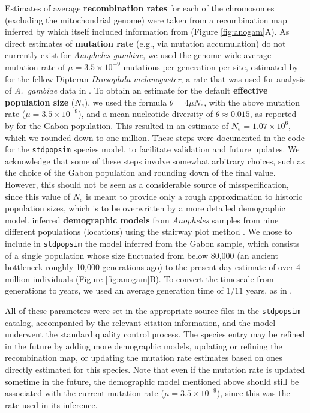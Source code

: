 \documentclass[hidelinks]{article}
\newcommand{\stdpopsim}{\texttt{stdpopsim}\xspace}
\begin{document}

Estimates of average \textbf{recombination rates} for each of the chromosomes (excluding the mitochondrial genome)
were taken from a recombination map inferred by \citet{Pombi2006} which itself included information from
\citet{zheng1996integrated} (Figure \ref{fig:anogam}A).
As direct estimates of \textbf{mutation rate} (e.g., via mutation accumulation) do not currently exist for \emph{Anopheles gambiae},
we used the genome-wide average mutation rate of $\mu=3.5 \times 10^{-9}$ mutations per generation per site,
estimated by \cite{Keightley2009} for the fellow Dipteran \textit{Drosophila melanogaster},
a rate that was used for analysis of \textit{A.~gambiae} data in \citet{Miles2017}.
To obtain an estimate for the default \textbf{effective population size} ($N_e$),
we used the formula $\theta=4\mu N_e$,
with the above mutation rate ($\mu=3.5 \times 10^{-9}$),
and a mean nucleotide diversity of $\theta\approx 0.015$,
as reported by \citet{Miles2017} for the Gabon population.
This resulted in an estimate of $N_e=1.07\times 10^{6}$,
which we rounded down to one million. 
These steps were documented in the code for the \stdpopsim species model,
to facilitate validation and future updates.
We acknowledge that some of these steps involve somewhat arbitrary choices,
such as the choice of the Gabon population and rounding down of the final value.
However, this should not be seen as a considerable source of misspecification,
since this value of $N_e$ is meant to provide only a rough approximation to
historic population sizes, which is to be overwritten by a more detailed demographic model.
\citet{Miles2017} inferred \textbf{demographic models} from \textit{Anopheles} samples from nine different populations (locations) using the stairway plot method \citep{Liu2015}.
We chose to include in \stdpopsim the model inferred from the Gabon sample, 
which consists of a single population whose size fluctuated from below 80,000
(an ancient bottleneck roughly 10,000 generations ago) to the present-day estimate of over 4 million individuals (Figure \ref{fig:anogam}B).
To convert the timescale from generations to years,
we used an average generation time of $1/11$ years,
as in \cite{Miles2017}.


All of these parameters were set in the appropriate source files in the \stdpopsim catalog,
accompanied by the relevant citation information,
and the model underwent the standard quality control process.
The species entry may be refined in the future by adding more demographic models,
updating or refining the recombination map,
or updating the mutation rate estimates based on ones directly estimated for this species.
Note that even if the mutation rate is updated sometime in the future,
the demographic model mentioned above should still be associated with the current
mutation rate ($\mu=3.5 \times 10^{-9}$),
since this was the rate used in its inference.
\end{document}
